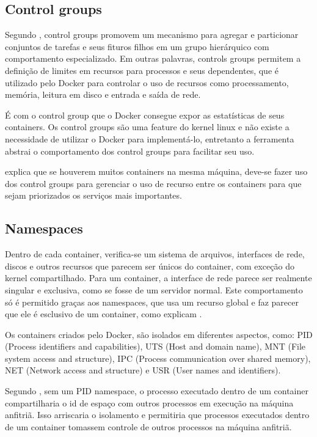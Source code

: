 \documentclass[
	12pt,				%
	openright,			%
	oneside,			%
	a4paper,			%
	chapter=TITLE,		%
	section=TITLE,		%
	english,			%
	french,				%
	spanish,			%
	brazil				%
	]{abntex2}
\begin{document}
\subsection{Control groups}

Segundo , control groups promovem um mecanismo para agregar e particionar conjuntos de tarefas e seus fituros filhos em um grupo hierárquico com comportamento especializado. Em outras palavras, controls groups permitem a definição de limites em recursos para processos e seus dependentes, que é utilizado pelo Docker para controlar o uso de recursos como processamento, memória, leitura em disco e entrada e saída de rede.

É com o control group que o Docker consegue expor as estatísticas de seus containers. Os control groups são uma feature do kernel linux e não existe a necessidade de utilizar o Docker para implementá-lo, entretanto a ferramenta abstrai o comportamento dos control groups para facilitar seu uso.

 explica que se houverem muitos containers na mesma máquina, deve-se fazer uso dos control groups para gerenciar o uso de recurso entre os containers para que sejam priorizados os serviços mais importantes.

\subsection{Namespaces}

Dentro de cada container, verifica-se um sistema de arquivos, interfaces de rede, discos e outros recursos que parecem ser únicos do container, com exceção do kernel compartilhado. Para um container, a interface de rede parece ser realmente singular e exclusiva, como se fosse de um servidor normal. Este comportamento só é permitido graças aos namespaces, que usa um recurso global e faz parecer que ele é esclusivo de um container, como explicam .

Os containers criados pelo Docker, são isolados em diferentes aspectos, como: PID (Process identifiers and capabilities), UTS (Host and domain name), MNT (File system access and structure), IPC (Process communication over shared memory), NET (Network access and structure) e USR (User names and identifiers). 

Segundo , sem um PID namespace, o processo executado dentro de um container compartilharia o id de espaço com outros processos em execução na máquina anfitriã. Isso arriscaria o isolamento e permitiria que processos executados dentro de um container tomassem controle de outros processos na máquina anfitriã.
\end{document}
